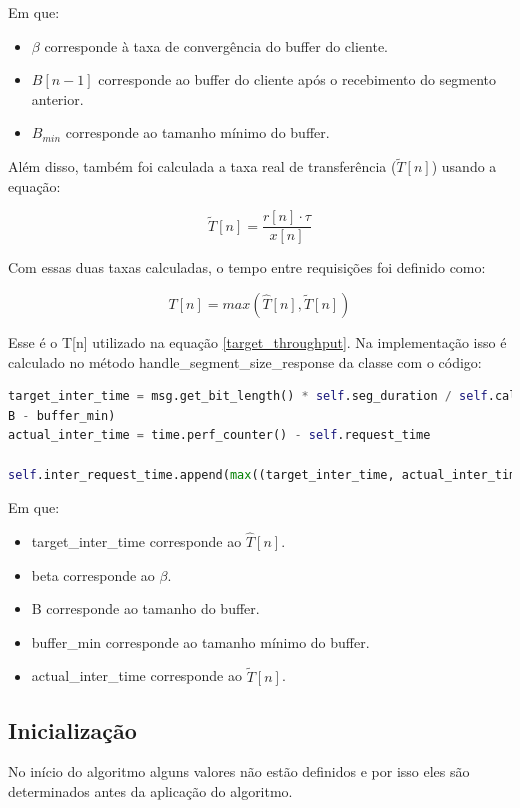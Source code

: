 \documentclass[10pt,twocolumn,letterpaper]{article}
\begin{document}
	Em que:
	\begin{itemize}
		\item $\beta$ corresponde à taxa de convergência do buffer do cliente.
		\item $B[n-1]$ corresponde ao buffer do cliente após o recebimento do segmento anterior.
		\item $B_{min}$ corresponde ao tamanho mínimo do buffer.
	\end{itemize}
	
	Além disso, também foi calculada a taxa real de transferência ($\tilde{T}[n]$) usando a equação:
	
	\begin{equation}
		\tilde{T}[n] = \frac{r[n] \cdot \tau}{x[n]}
	\end{equation}
	
	Com essas duas taxas calculadas, o tempo entre requisições foi definido como:
	
	\begin{equation}
		T[n] = max(\hat{T}[n], \tilde{T}[n])
	\end{equation}
	
	Esse é o T[n] utilizado na equação \ref{target_throughput}. Na implementação isso é calculado no método handle\_segment\_size\_response da classe com o código:
	
	\begin{lstlisting}[language=python]
target_inter_time = msg.get_bit_length() * self.seg_duration / self.calc_throughputs[-1] + beta * (
B - buffer_min)
actual_inter_time = time.perf_counter() - self.request_time

self.inter_request_time.append(max((target_inter_time, actual_inter_time))) 
	\end{lstlisting}
	
	Em que:
	
	\begin{itemize}
		\item target\_inter\_time corresponde ao $\hat{T}[n]$.
		\item beta corresponde ao $\beta$.
		\item B corresponde ao tamanho do buffer.
		\item buffer\_min corresponde ao tamanho mínimo do buffer.
		\item actual\_inter\_time corresponde ao $\tilde{T}[n]$.
	\end{itemize}
	
	\subsection{Inicialização}
	No início do algoritmo alguns valores não estão definidos e por isso eles são determinados antes da aplicação do algoritmo.
	
\end{document}
